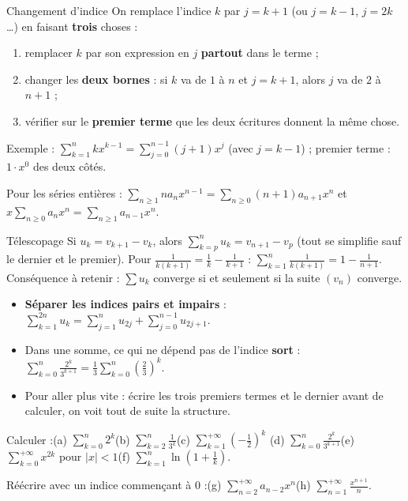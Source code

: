 \documentclass[a4paper,10pt]{article}
\begin{document}
\begin{METH}{Changement d'indice}
On remplace l'indice $k$ par $j=k+1$ (ou $j=k-1$, $j=2k$\dots) en faisant \textbf{trois} choses :
\begin{enumerate}
\item remplacer $k$ par son expression en $j$ \textbf{partout} dans le terme ;
\item changer les \textbf{deux bornes} : si $k$ va de $1$ à $n$ et $j=k+1$, alors $j$ va de $2$ à $n+1$ ;
\item vérifier sur le \textbf{premier terme} que les deux écritures donnent la même chose.
\end{enumerate}
Exemple : $\displaystyle\sum_{k=1}^nkx^{k-1}=\sum_{j=0}^{n-1}(j+1)x^j$ (avec $j=k-1$) ; premier terme : $1\cdot x^0$ des deux côtés.

Pour les séries entières : $\displaystyle\sum_{n\geq1}na_nx^{n-1}=\sum_{n\geq0}(n+1)a_{n+1}x^n$ et $\displaystyle x\sum_{n\geq0}a_nx^n=\sum_{n\geq1}a_{n-1}x^n$.
\end{METH}

\begin{METH}{Télescopage}
Si $u_k=v_{k+1}-v_k$, alors $\displaystyle\sum_{k=p}^nu_k=v_{n+1}-v_p$ (tout se simplifie sauf le dernier et le premier). Pour
$\frac1{k(k+1)}=\frac1k-\frac1{k+1}$ : $\displaystyle\sum_{k=1}^n\frac1{k(k+1)}=1-\frac1{n+1}$.
Conséquence à retenir : $\sum u_k$ converge si et seulement si la suite $(v_n)$ converge.
\end{METH}

\begin{ASTU}
\begin{itemize}
\item \textbf{Séparer les indices pairs et impairs} : $\sum_{k=1}^{2n}u_k=\sum_{j=1}^nu_{2j}+\sum_{j=0}^{n-1}u_{2j+1}$.
\item Dans une somme, ce qui ne dépend pas de l'indice \textbf{sort} : $\sum_{k=0}^n\frac{2^k}{3^{k+1}}=\frac13\sum_{k=0}^n\left(\frac23\right)^k$.
\item Pour aller plus vite : écrire les trois premiers termes et le dernier avant de calculer, on voit tout de suite la structure.
\end{itemize}
\end{ASTU}

\begin{EXO}
Calculer :\quad (a) $\displaystyle\sum_{k=0}^n2^k$\quad (b) $\displaystyle\sum_{k=2}^n\frac1{3^k}$\quad (c) $\displaystyle\sum_{k=1}^{+\infty}\left(-\frac12\right)^k$\quad
(d) $\displaystyle\sum_{k=0}^n\frac{2^k}{3^{k+1}}$\quad (e) $\displaystyle\sum_{k=0}^{+\infty}x^{2k}$ pour $|x|<1$\quad (f) $\displaystyle\sum_{k=1}^n\ln\left(1+\frac1k\right)$.

Réécrire avec un indice commençant à $0$ :\quad (g) $\displaystyle\sum_{n=2}^{+\infty}a_{n-2}x^n$\quad (h) $\displaystyle\sum_{n=1}^{+\infty}\frac{x^{n+1}}{n}$.
\end{EXO}
\end{document}
